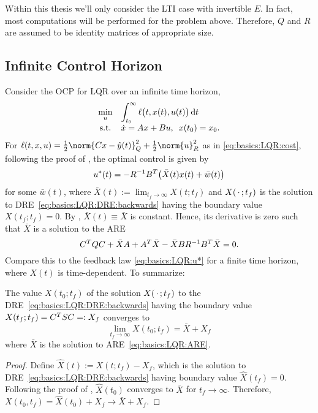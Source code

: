 Within this thesis we'll only consider the \ac{LTI} case with invertible $E$.
In fact, most computations will be performed for the problem above.
Therefore, $Q$ and $R$ are assumed to be identity matrices of appropriate size.

\subsection{Infinite Control Horizon}

Consider the \ac{OCP} for \ac{LQR} over an infinite time horizon,
\begin{equation}
\label{eq:basics:OCP'}
  \everymath{\displaystyle}
  \begin{array}{cl}
    \min_u & \int_{t_0}^{\infty} \ell\big(t, x(t), u(t)\big) \dt \\
    \text{s.t.} & \dot{x} = Ax + Bu, \enspace x(t_0) = x_0
    .
  \end{array}
\end{equation}
For
$
  \ell(t, x, u) = \onehalf \norm{Cx - \hat y(t)}_Q^2 + \onehalf \norm{u}_R^2
$
as in \eqref{eq:basics:LQR:cost},
following the proof of \cite[Theorem~3.2]{Locatelli2011},
the optimal control is given by
\begin{equation}
  u^*(t) = - R^{-1} B^T \big( \bar X(t) x(t) + \bar w(t) \big)
\end{equation}
for some $\bar w(t)$,
where $\bar X(t) := \lim_{t_f \to\infty} X(t; t_f)$
and $X(\optional{};t_f)$ is the solution to \ac{DRE}~\eqref{eq:basics:LQR:DRE:backwards}
having the boundary value $X(t_f; t_f) = 0$. %
By \cite[Theorem~3.3]{Locatelli2011},
$\bar X(t) \equiv \bar X$ is constant.
Hence, its derivative is zero such that $\bar X$ is a solution to the \ac{ARE}
\begin{equation}
\label{eq:basics:LQR:ARE}
  C^T Q C + \bar X A + A^T \bar X - \bar X B R^{-1} B^T \bar X = 0
  .
\end{equation}
Compare this to the feedback law \eqref{eq:basics:LQR:u*} for a finite time horizon,
where $X(t)$ is time-dependent.
To summarize:

\begin{proposition}
\label{thm:basics:dre-limit-are:backwards}
  The value $X(t_0; t_f)$ of the solution $X(\optional{}; t_f)$ to the \ac{DRE}~\eqref{eq:basics:LQR:DRE:backwards}
  having the boundary value $X(t_f; t_f) = C^T S C =: X_f$
  converges to
  \begin{equation}
    \lim_{t_f\to\infty} X(t_0; t_f) = \bar X + X_f
  \end{equation}
  where $\bar X$ is the solution to \ac{ARE}~\eqref{eq:basics:LQR:ARE}.
\end{proposition}
\begin{proof}
  Define $\hat X(t) := X(t; t_f) - X_f$,
  which is the solution to \ac{DRE}~\eqref{eq:basics:LQR:DRE:backwards} having boundary value $\hat X(t_f) = 0$.
  Following the proof of \cite[Theorem~3.3]{Locatelli2011},
  $\hat X(t_0)$ converges to $\bar X$ for $t_f\to\infty$.
  Therefore, $X(t_0, t_f) = \hat X(t_0) + X_f \to \bar X + X_f$.
\end{proof}

